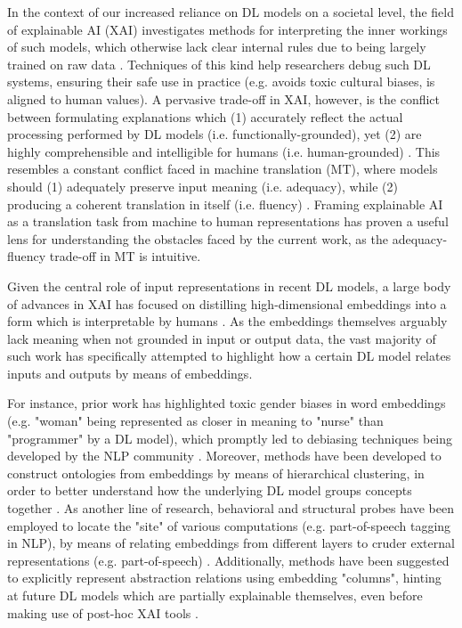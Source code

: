 In the context of our increased reliance on DL models on a societal level, the field of explainable AI (XAI) investigates methods for interpreting the inner workings of such models, which otherwise lack clear internal rules due to being largely trained on raw data \citep{arrieta_explainable_2019}. Techniques of this kind help researchers debug such DL systems, ensuring their safe use in practice (e.g. avoids toxic cultural biases, is aligned to human values). A pervasive trade-off in XAI, however, is the conflict between formulating explanations which (1) accurately reflect the actual processing performed by DL models (i.e. functionally-grounded), yet (2) are highly comprehensible and intelligible for humans (i.e. human-grounded) \citep{madsen_post-hoc_2021}. This resembles a constant conflict faced in machine translation (MT), where models should (1) adequately preserve input meaning (i.e. adequacy), while (2) producing a coherent translation in itself (i.e. fluency) \citep{koehn_neural_2017}. Framing explainable AI as a translation task from machine to human representations has proven a useful lens for understanding the obstacles faced by the current work, as the adequacy-fluency trade-off in MT is intuitive.

Given the central role of input representations in recent DL models, a large body of advances in XAI has focused on distilling high-dimensional embeddings into a form which is interpretable by humans \citep{madsen_post-hoc_2021}. As the embeddings themselves arguably lack meaning when not grounded in input or output data, the vast majority of such work has specifically attempted to highlight how a certain DL model relates inputs and outputs by means of embeddings.

For instance, prior work has highlighted toxic gender biases in word embeddings (e.g. "woman" being represented as closer in meaning to "nurse" than "programmer" by a DL model), which promptly led to debiasing techniques being developed by the NLP community \citep{bolukbasi_man_2016}. Moreover, methods have been developed to construct ontologies from embeddings by means of hierarchical clustering, in order to better understand how the underlying DL model groups concepts together \citep{liu_interpretation_2018}. As another line of research, behavioral and structural probes have been employed to locate the "site" of various computations (e.g. part-of-speech tagging in NLP), by means of relating embeddings from different layers to cruder external representations (e.g. part-of-speech) \citep{tenney_bert_2019}. Additionally, methods have been suggested to explicitly represent abstraction relations using embedding "columns", hinting at future DL models which are partially explainable themselves, even before making use of post-hoc XAI tools \citep{hinton_how_2021}.

